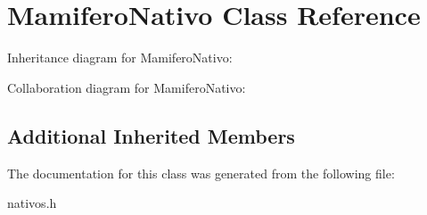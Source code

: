 \hypertarget{classMamiferoNativo}{}\section{Mamifero\+Nativo Class Reference}
\label{classMamiferoNativo}


Inheritance diagram for Mamifero\+Nativo\+:


Collaboration diagram for Mamifero\+Nativo\+:
\subsection*{Additional Inherited Members}


The documentation for this class was generated from the following file\+:\begin{DoxyCompactItemize}
\item 
nativos.\+h\end{DoxyCompactItemize}
